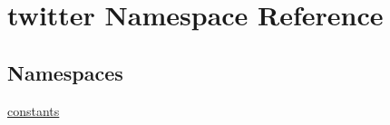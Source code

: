 \hypertarget{namespacetwitter}{}\section{twitter Namespace Reference}
\label{namespacetwitter}
\subsection*{Namespaces}
\begin{DoxyCompactItemize}
\item 
 \hyperlink{namespacetwitter_1_1constants}{constants}
\end{DoxyCompactItemize}
